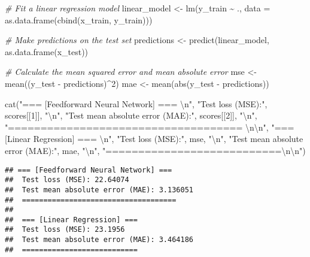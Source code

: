 \documentclass[
]{article}
\newenvironment{Shaded}{\begin{snugshade}}{\end{snugshade}}
\newcommand{\AttributeTok}[1]{\textcolor[rgb]{0.77,0.63,0.00}{#1}}
\newcommand{\CommentTok}[1]{\textcolor[rgb]{0.56,0.35,0.01}{\textit{#1}}}
\newcommand{\DecValTok}[1]{\textcolor[rgb]{0.00,0.00,0.81}{#1}}
\newcommand{\FunctionTok}[1]{\textcolor[rgb]{0.00,0.00,0.00}{#1}}
\newcommand{\NormalTok}[1]{#1}
\newcommand{\OtherTok}[1]{\textcolor[rgb]{0.56,0.35,0.01}{#1}}
\newcommand{\SpecialCharTok}[1]{\textcolor[rgb]{0.00,0.00,0.00}{#1}}
\newcommand{\StringTok}[1]{\textcolor[rgb]{0.31,0.60,0.02}{#1}}
\begin{document}
\begin{Shaded}
\begin{Highlighting}[]
\CommentTok{\# Fit a linear regression model}
\NormalTok{linear\_model }\OtherTok{\textless{}{-}} \FunctionTok{lm}\NormalTok{(y\_train }\SpecialCharTok{\textasciitilde{}}\NormalTok{ ., }\AttributeTok{data =} \FunctionTok{as.data.frame}\NormalTok{(}\FunctionTok{cbind}\NormalTok{(x\_train, y\_train)))}

\CommentTok{\# Make predictions on the test set}
\NormalTok{predictions }\OtherTok{\textless{}{-}} \FunctionTok{predict}\NormalTok{(linear\_model, }\FunctionTok{as.data.frame}\NormalTok{(x\_test))}

\CommentTok{\# Calculate the mean squared error and mean absolute error}
\NormalTok{mse }\OtherTok{\textless{}{-}} \FunctionTok{mean}\NormalTok{((y\_test }\SpecialCharTok{{-}}\NormalTok{ predictions)}\SpecialCharTok{\^{}}\DecValTok{2}\NormalTok{)}
\NormalTok{mae }\OtherTok{\textless{}{-}} \FunctionTok{mean}\NormalTok{(}\FunctionTok{abs}\NormalTok{(y\_test }\SpecialCharTok{{-}}\NormalTok{ predictions))}

\FunctionTok{cat}\NormalTok{(}\StringTok{"=== [Feedforward Neural Network] === }\SpecialCharTok{\textbackslash{}n}\StringTok{"}\NormalTok{, }\StringTok{"Test loss (MSE):"}\NormalTok{, scores[[}\DecValTok{1}\NormalTok{]], }
    \StringTok{"}\SpecialCharTok{\textbackslash{}n}\StringTok{"}\NormalTok{,}
    \StringTok{"Test mean absolute error (MAE):"}\NormalTok{, scores[[}\DecValTok{2}\NormalTok{]], }
    \StringTok{"}\SpecialCharTok{\textbackslash{}n}\StringTok{"}\NormalTok{,}
    \StringTok{"==================================== }\SpecialCharTok{\textbackslash{}n\textbackslash{}n}\StringTok{"}\NormalTok{,}
    \StringTok{"=== [Linear Regression] === }\SpecialCharTok{\textbackslash{}n}\StringTok{"}\NormalTok{,}
    \StringTok{"Test loss (MSE):"}\NormalTok{, mse, }\StringTok{"}\SpecialCharTok{\textbackslash{}n}\StringTok{"}\NormalTok{,}
    \StringTok{"Test mean absolute error (MAE):"}\NormalTok{, mae, }\StringTok{"}\SpecialCharTok{\textbackslash{}n}\StringTok{"}\NormalTok{,}
    \StringTok{"===========================}\SpecialCharTok{\textbackslash{}n\textbackslash{}n}\StringTok{"}\NormalTok{)}
\end{Highlighting}
\end{Shaded}

\begin{verbatim}
## === [Feedforward Neural Network] === 
##  Test loss (MSE): 22.64074 
##  Test mean absolute error (MAE): 3.136051 
##  ==================================== 
## 
##  === [Linear Regression] === 
##  Test loss (MSE): 23.1956 
##  Test mean absolute error (MAE): 3.464186 
##  ===========================
\end{verbatim}
\end{document}
